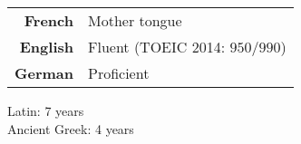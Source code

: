 
\begin{tabularx}{\textwidth}{@{}d X@{}}
  \textbf{French} & Mother tongue\\
  \textbf{English} & Fluent (\textcolor{english}{TOEIC 2014: $950 / 990$})\\
  \textbf{German} & Proficient\\
\end{tabularx}

\vspace{0.5pt}

{\small
  Latin: 7 years\\
  Ancient Greek: 4 years}


